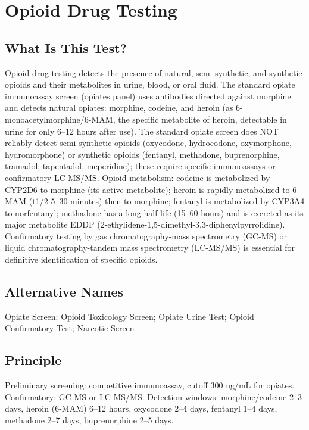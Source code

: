 \chapter{Opioid Drug Testing}
\section*{What Is This Test?}
Opioid drug testing detects the presence of natural, semi-synthetic, and synthetic opioids and their metabolites in urine, blood, or oral fluid. The standard opiate immunoassay screen (opiates panel) uses antibodies directed against morphine and detects natural opiates: morphine, codeine, and heroin (as 6-monoacetylmorphine/6-MAM, the specific metabolite of heroin, detectable in urine for only 6--12 hours after use). The standard opiate screen does NOT reliably detect semi-synthetic opioids (oxycodone, hydrocodone, oxymorphone, hydromorphone) or synthetic opioids (fentanyl, methadone, buprenorphine, tramadol, tapentadol, meperidine); these require specific immunoassays or confirmatory LC-MS/MS. Opioid metabolism: codeine is metabolized by CYP2D6 to morphine (its active metabolite); heroin is rapidly metabolized to 6-MAM (t1/2 5--30 minutes) then to morphine; fentanyl is metabolized by CYP3A4 to norfentanyl; methadone has a long half-life (15--60 hours) and is excreted as its major metabolite EDDP (2-ethylidene-1,5-dimethyl-3,3-diphenylpyrrolidine). Confirmatory testing by gas chromatography-mass spectrometry (GC-MS) or liquid chromatography-tandem mass spectrometry (LC-MS/MS) is essential for definitive identification of specific opioids.
\section*{Alternative Names}
Opiate Screen; Opioid Toxicology Screen; Opiate Urine Test; Opioid Confirmatory Test; Narcotic Screen
\section*{Principle}
Preliminary screening: competitive immunoassay, cutoff 300 ng/mL for opiates. Confirmatory: GC-MS or LC-MS/MS. Detection windows: morphine/codeine 2--3 days, heroin (6-MAM) 6--12 hours, oxycodone 2--4 days, fentanyl 1--4 days, methadone 2--7 days, buprenorphine 2--5 days.
